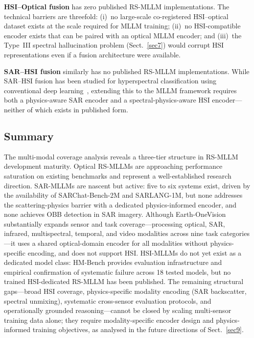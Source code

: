 \textbf{HSI--Optical fusion} has zero published RS-MLLM implementations.
The technical barriers are threefold: (i)~no large-scale co-registered
HSI--optical dataset exists at the scale required for MLLM training;
(ii)~no HSI-compatible encoder exists that can be paired with an optical
MLLM encoder; and (iii)~the Type~III spectral hallucination problem
(Sect.~\ref{sec7}) would corrupt HSI representations even if a fusion
architecture were available.

\textbf{SAR--HSI fusion} similarly has no published RS-MLLM implementations.
While SAR--HSI fusion has been studied for hyperspectral classification
using conventional deep learning~\cite{hong2021multimodal}, extending this
to the MLLM framework requires both a physics-aware SAR encoder and a
spectral-physics-aware HSI encoder---neither of which exists in published form.

\subsection*{Summary}

The multi-modal coverage analysis reveals a three-tier structure in RS-MLLM
development maturity. Optical RS-MLLMs are approaching performance saturation
on existing benchmarks and represent a well-established research direction.
SAR-MLLMs are nascent but active: five to six systems exist, driven by the
availability of SARChat-Bench-2M and SARLANG-1M, but none addresses the
scattering-physics barrier with a dedicated physics-informed encoder, and none
achieves OBB detection in SAR imagery.
Although Earth-OneVision~\cite{earthonevision2026} substantially expands sensor
and task coverage---processing optical, SAR, infrared, multispectral, temporal,
and video modalities across nine task categories---it uses a shared
optical-domain encoder for all modalities without physics-specific encoding,
and does not support HSI.
HSI-MLLMs do not yet exist as a dedicated model class: HM-Bench provides
evaluation infrastructure and empirical confirmation of systematic failure across
18 tested models, but no trained HSI-dedicated RS-MLLM has been published.
The remaining structural gaps---broad HSI coverage, physics-specific modality
encoding (SAR backscatter, spectral unmixing), systematic cross-sensor
evaluation protocols, and operationally grounded reasoning---cannot be closed
by scaling multi-sensor training data alone; they require modality-specific
encoder design and physics-informed training objectives, as analysed in the
future directions of Sect.~\ref{sec9}.
